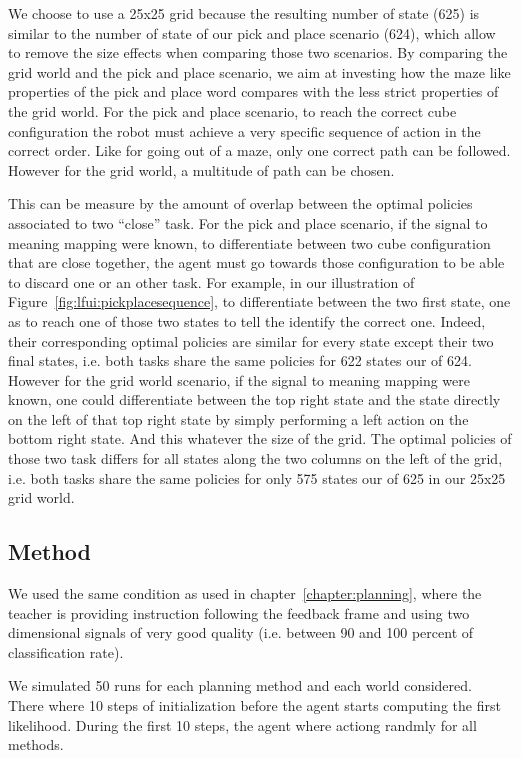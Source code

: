 We choose to use a 25x25 grid because the resulting number of state (625) is similar to the number of state of our pick and place scenario (624), which allow to remove the size effects when comparing those two scenarios. By comparing the grid world and the pick and place scenario, we aim at investing how the maze like properties of the pick and place word compares with the less strict properties of the grid world. For the pick and place scenario, to reach the correct cube configuration the robot must achieve a very specific sequence of action in the correct order. Like for going out of a maze, only one correct path can be followed. However for the grid world, a multitude of path can be chosen. 

This can be measure by the amount of overlap between the optimal policies associated to two ``close'' task. For the pick and place scenario, if the signal to meaning mapping were known, to differentiate between two cube configuration that are close together, the agent must go towards those configuration to be able to discard one or an other task. For example, in our illustration of Figure~\ref{fig:lfui:pickplacesequence}, to differentiate between the two first state, one as to reach one of those two states to tell the identify the correct one. Indeed, their corresponding optimal policies are similar for every state except their two final states, i.e. both tasks share the same policies for 622 states our of 624. However for the grid world scenario, if the signal to meaning mapping were known, one could differentiate between the top right state and the state directly on the left of that top right state by simply performing a left action on the bottom right state. And this whatever the size of the grid. The optimal policies of those two task differs for all states along the two columns on the left of the grid, i.e. both tasks share the same policies for only 575 states our of 625 in our 25x25 grid world.

\subsection{Method}

We used the same condition as used in chapter~\ref{chapter:planning}, where the teacher is providing instruction following the feedback frame and using two dimensional signals of very good quality (i.e. between 90 and 100 percent of classification rate).

We simulated 50 runs for each planning method and each world considered. There where 10 steps of initialization before the agent starts computing the first likelihood. During the first 10 steps, the agent where actiong randmly for all methods.

